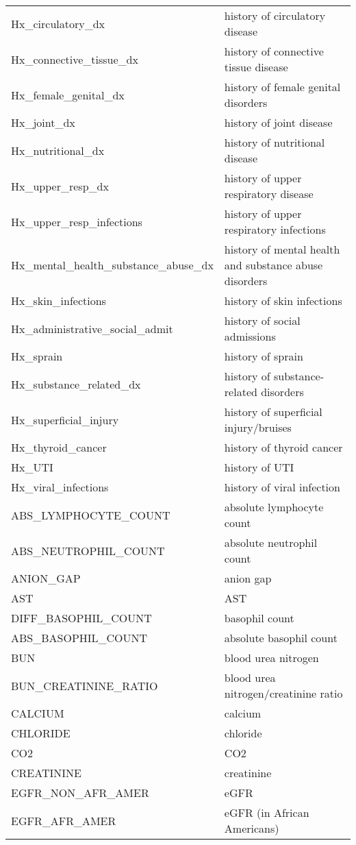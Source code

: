 \begin{tabular}{ll}
Hx\_circulatory\_dx & history of circulatory disease \\
Hx\_connective\_tissue\_dx & history of connective tissue disease \\
Hx\_female\_genital\_dx & history of female genital disorders \\
Hx\_joint\_dx & history of joint disease \\
Hx\_nutritional\_dx & history of nutritional disease \\
Hx\_upper\_resp\_dx & history of upper respiratory disease \\
Hx\_upper\_resp\_infections & history of upper respiratory infections \\
Hx\_mental\_health\_substance\_abuse\_dx & history of mental health and substance abuse disorders \\
Hx\_skin\_infections & history of skin infections \\
Hx\_administrative\_social\_admit & history of social admissions \\
Hx\_sprain & history of sprain \\
Hx\_substance\_related\_dx & history of substance-related disorders \\
Hx\_superficial\_injury & history of superficial injury/bruises \\
Hx\_thyroid\_cancer & history of thyroid cancer \\
Hx\_UTI & history of UTI \\
Hx\_viral\_infections & history of viral infection \\
ABS\_LYMPHOCYTE\_COUNT & absolute lymphocyte count \\
ABS\_NEUTROPHIL\_COUNT & absolute neutrophil count \\
ANION\_GAP & anion gap \\
AST & AST \\
DIFF\_BASOPHIL\_COUNT & basophil count \\
ABS\_BASOPHIL\_COUNT & absolute basophil count \\
BUN & blood urea nitrogen \\
BUN\_CREATININE\_RATIO & blood urea nitrogen/creatinine ratio \\
CALCIUM & calcium \\
CHLORIDE & chloride \\
CO2 & CO2 \\
CREATININE & creatinine \\
EGFR\_NON\_AFR\_AMER & eGFR \\
EGFR\_AFR\_AMER & eGFR (in African Americans) \\

\end{tabular}
